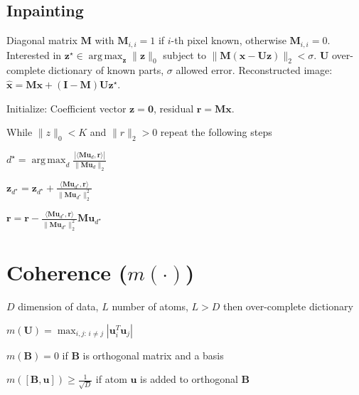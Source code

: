 \documentclass[a4paper, 11pt, landscape]{article}
\DeclareMathOperator*{\argmax}{arg\,max}
\begin{document}
\begin{multicols*}{3}
\subsection{Inpainting}
Diagonal matrix $\mathbf{M}$ with $\mathbf{M}_{i, i} = 1$ if $i$-th pixel known, otherwise $\mathbf{M}_{i,i} = 0$. Interested in $\mathbf{z}^\star \in \argmax_{\mathbf{z}} \|\mathbf{z}\|_0$ subject to $\|\mathbf{M}(\mathbf{x} - \mathbf{Uz})\|_2 < \sigma$. $\mathbf{U}$ over-complete dictionary of known parts, $\sigma$ allowed error. Reconstructed image: $\hat{\mathbf{x}} = \mathbf{Mx} + (\mathbf{I} - \mathbf{M})\mathbf{U} \mathbf{z}^\star$.
\begin{compactenum}
	\item Initialize: Coefficient vector $\mathbf{z} = \mathbf{0}$, residual $\mathbf{r} = \mathbf{M}\mathbf{x}$.
	\item While $\|z\|_0 < K$ and $\|r\|_2 > 0$ repeat the following steps
	\begin{listcols}[2][5pt]
		\item $d^\star = \argmax_d \frac{|\langle \mathbf{M}\mathbf{u}_d, \mathbf{r}\rangle|}{\|\mathbf{M}\mathbf{u}_d\|_2}$
		\item $\mathbf{z}_{d^\star} = \mathbf{z}_{d^\star} + \frac{\langle \mathbf{M}\mathbf{u}_{d^\star}, \mathbf{r} \rangle}{\|\mathbf{M}\mathbf{u}_{d^\star}\|_2^2}$
		\item $\mathbf{r} = \mathbf{r} - \frac{\langle \mathbf{M}\mathbf{u}_{d^\star}, \mathbf{r} \rangle}{\|\mathbf{M}\mathbf{u}_{d^\star}\|_2^2} \mathbf{M}\mathbf{u}_{d^\star}$
	\end{listcols}
\end{compactenum}


\section{Coherence ($m(\cdot)$)}
\begin{compactitem}
	\item $D$ dimension of data, $L$ number of atoms, $L > D$ then over-complete dictionary
	\item $m(\mathbf{U}) = \max_{i,j:\, i \neq j} | \mathbf{u}_i^T \mathbf{u}_j |$
	\item $m(\mathbf{B}) = 0$ if $\mathbf{B}$ is orthogonal matrix and a basis
	\item $m([\mathbf{B}, \mathbf{u}]) \geq \frac{1}{\sqrt{D}}$ if atom $\mathbf{u}$ is added to orthogonal $\mathbf{B}$
\end{compactitem}


\end{multicols*}
\end{document}

